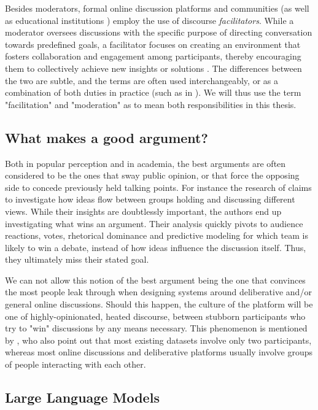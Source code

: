Besides moderators, formal online discussion platforms and communities (as well as educational institutions \cite{Wang2008StudentfacilitatorsRI, Zhong2019ExploringTR}) employ the use of discourse \textit{facilitators}. While a moderator oversees discussions with the specific purpose of directing conversation towards predefined goals, a facilitator focuses on creating an environment that fosters collaboration and engagement among participants, thereby encouraging them to collectively achieve new insights or solutions \cite{wef_moderation}. The differences between the two are subtle, and the terms are often used interchangeably, or as a combination of both duties in practice (such as in \citet{Zhong2019ExploringTR, Carson2008}). We will thus use the term "facilitation" and "moderation" as to mean both responsibilities in this thesis. 

\subsection{What makes a good argument?}
\label{sec:background:good-argument}

Both in popular perception and in academia, the best arguments are often considered to be the ones that sway public opinion, or that force the opposing side to concede previously held talking points. For instance the research of \citet{zhang2016-oxford} claims to investigate how ideas flow between groups holding and discussing different views. While their insights are doubtlessly important, the authors end up investigating what wins an argument. Their analysis quickly pivots to audience reactions, votes, rhetorical dominance and predictive modeling for which team is likely to win a debate, instead of how ideas influence the discussion itself. Thus, they ultimately miss their stated goal.

We can not allow this notion of the best argument being the one that convinces the most people leak through when designing systems around deliberative and/or general online discussions. Should this happen, the culture of the platform will be one of highly-opinionated, heated discourse, between stubborn participants who try to "win" discussions by any means necessary. This phenomenon is mentioned by \citet{karadzhov2023delidata}, who also point out that most existing datasets involve only two participants, whereas most online discussions and deliberative platforms usually involve groups of people interacting with each other. 


\subsection{Large Language Models}
\label{sec:background:llm}

